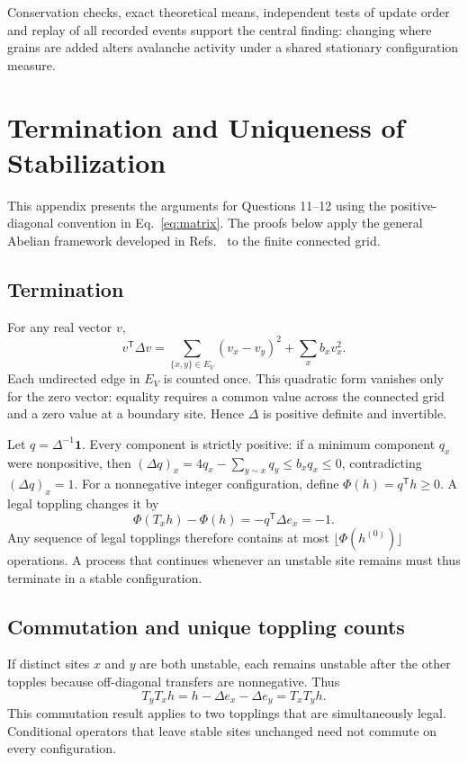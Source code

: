 \documentclass[11pt,a4paper,oneside]{report}
\newcommand{\one}{\mathbf{1}}
\numberwithin{equation}{chapter}
\begin{document}
Conservation checks, exact theoretical means, independent tests of update order and replay of all recorded events support the central finding: changing where grains are added alters avalanche activity under a shared stationary configuration measure.
\FloatBarrier

\appendix
\chapter{Termination and Uniqueness of Stabilization}
\label{app:proofs}
This appendix presents the arguments for Questions 11--12 using the positive-diagonal convention in Eq.~\eqref{eq:matrix}. The proofs below apply the general Abelian framework developed in Refs.~\cite{dhar1990,jarai2018} to the finite connected grid.

\section{Termination}
For any real vector $v$,
\begin{equation}
 v^{\mathsf T}\Delta v
 =\sum_{\{x,y\}\in E_V}(v_x-v_y)^2+\sum_x b_xv_x^2.
\end{equation}
Each undirected edge in $E_V$ is counted once. This quadratic form vanishes only for the zero vector: equality requires a common value across the connected grid and a zero value at a boundary site. Hence $\Delta$ is positive definite and invertible.

Let $q=\Delta^{-1}\one$. Every component is strictly positive: if a minimum component $q_x$ were nonpositive, then
$(\Delta q)_x=4q_x-\sum_{y\sim x}q_y\leq b_xq_x\leq0$,
contradicting $(\Delta q)_x=1$.
For a nonnegative integer configuration, define $\Phi(h)=q^{\mathsf T}h\geq0$. A legal toppling changes it by
\begin{equation}
 \Phi(T_xh)-\Phi(h)=-q^{\mathsf T}\Delta e_x=-1.
\end{equation}
Any sequence of legal topplings therefore contains at most $\lfloor\Phi(h^{(0)})\rfloor$ operations. A process that continues whenever an unstable site remains must thus terminate in a stable configuration.

\section{Commutation and unique toppling counts}
If distinct sites $x$ and $y$ are both unstable, each remains unstable after the other topples because off-diagonal transfers are nonnegative. Thus
\begin{equation}
 T_yT_xh=h-\Delta e_x-\Delta e_y=T_xT_yh.
\end{equation}
This commutation result applies to two topplings that are simultaneously legal. Conditional operators that leave stable sites unchanged need not commute on every configuration.
\end{document}

